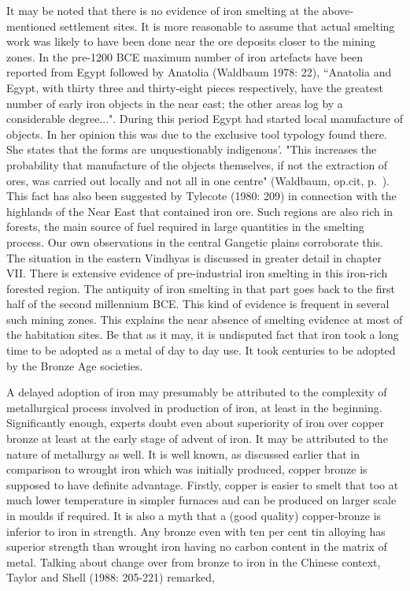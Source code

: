 It may be noted that there is no evidence of iron smelting at the above-mentioned settlement sites. It is more reasonable to assume that actual smelting work was likely to have been done near the ore deposits closer to the mining zones. In the pre-1200 BCE maximum number of iron artefacts have been reported from Egypt followed by Anatolia (Waldbaum 1978: 22), {\footnotesize ``Anatolia and Egypt, with thirty three and thirty-eight pieces respectively, have the greatest number of early iron objects in the near east; the other areas log by a considerable degree...".} During this period Egypt had started local manufacture of objects. In her opinion this was due to the exclusive tool typology found there. She states that the forms are unquestionably indigenous'. "This increases the probability that manufacture of the objects themselves, if not the extraction of ores, was carried out locally and not all in one centre" (Waldbaum, op.cit, p.~\pageref{pageno23}). This fact has also been suggested by Tylecote (1980: 209) in connection with the highlands of the Near East that contained iron ore. Such regions are also rich in forests, the main source of fuel required in large quantities in the smelting process. Our own observations in the central Gangetic plains corroborate this. The situation in the eastern Vindhyas is discussed in greater detail in chapter VII. There is extensive evidence of pre-industrial iron smelting in this iron-rich forested region. The antiquity of iron smelting in that part goes back to the first half of the second millennium BCE. This kind of evidence is frequent in several such mining zones. This explains the near absence of smelting evidence at most of the habitation sites. Be that as it may, it is undisputed fact that iron took a long time to be adopted as a metal of day to day use. It took centuries to be adopted by the Bronze Age societies. 

A delayed adoption of iron may presumably be attributed to the complexity of metallurgical process involved in production of iron, at least in the beginning. Significantly enough, experts doubt even about superiority of iron over copper bronze at least at the early stage of advent of iron. It may be attributed to the nature of metallurgy as well. It is well known, as discussed earlier that in comparison to wrought iron which was initially produced, copper bronze is supposed to have definite advantage. Firstly, copper is easier to smelt that too at much lower temperature in simpler furnaces and can be produced on larger scale in moulds if required. It is also a myth that a (good quality) copper-bronze is inferior to iron in strength. Any bronze even with ten per cent tin alloying has superior strength than wrought iron having no carbon content in the matrix of metal. Talking about change over from bronze to iron in the Chinese context, Taylor and Shell (1988: 205-221) remarked, 

